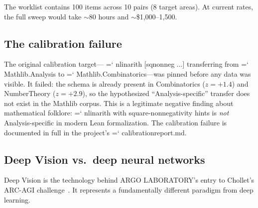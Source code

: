 \documentclass[11pt]{article}
\renewcommand{\texttt}[1]{%
  \begingroup\ttfamily\hyphenchar\font=`\-\relax
  \def\_{\textunderscore\discretionary{}{}{}}%
  #1\endgroup}
\theoremstyle{definition}
\theoremstyle{remark}
\begin{document}
The worklist contains 100 items across 10 pairs (8 target areas).
At current rates, the full sweep would take ${\sim}$80 hours and
${\sim}$\$1{,}000--1{,}500.

\subsection{The calibration failure}

The original calibration target---\texttt{nlinarith [sq\_nonneg ...]}
transferring from \texttt{Mathlib.Analysis} to
\texttt{Mathlib.Combinatorics}---was pinned before any data was
visible.  It failed: the schema is already present in
Combinatorics ($z = +1.4$) and NumberTheory ($z = +2.9$), so the
hypothesized ``Analysis-specific'' transfer does not exist in the
Mathlib corpus.  This is a legitimate negative finding about
mathematical folklore: \texttt{nlinarith} with square-nonnegativity
hints is \emph{not} Analysis-specific in modern Lean formalization.
The calibration failure is documented in full in the project's
\texttt{calibration\_report.md}.

\subsection{Deep Vision vs.\ deep neural networks}

Deep Vision is the technology behind ARGO LABORATORY's entry to Chollet's ARC-AGI challenge~\cite{chollet2019}.  It represents a fundamentally different paradigm from deep learning.
\end{document}
